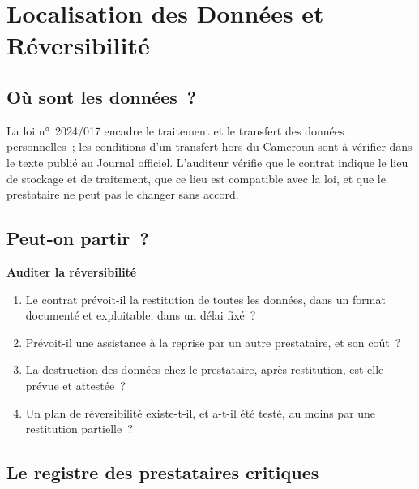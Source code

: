 \section{Localisation des Données et Réversibilité}
\label{sec:c24-donnees}

\subsection{Où sont les données~?}

La loi n°~2024/017 encadre le traitement et le transfert des données
personnelles~; les conditions d'un transfert hors du Cameroun sont à
vérifier dans le texte publié au Journal officiel. L'auditeur vérifie que
le contrat indique le lieu de stockage et de traitement, que ce lieu est
compatible avec la loi, et que le prestataire ne peut pas le changer sans
accord.

\subsection{Peut-on partir~?}

\begin{boxprocedure}
\textbf{Auditer la réversibilité}
\begin{enumerate}
    \item Le contrat prévoit-il la restitution de toutes les données, dans
          un format documenté et exploitable, dans un délai fixé~?
    \item Prévoit-il une assistance à la reprise par un autre prestataire,
          et son coût~?
    \item La destruction des données chez le prestataire, après
          restitution, est-elle prévue et attestée~?
    \item Un plan de réversibilité existe-t-il, et a-t-il été testé, au
          moins par une restitution partielle~?
\end{enumerate}
\end{boxprocedure}

\subsection{Le registre des prestataires critiques}

